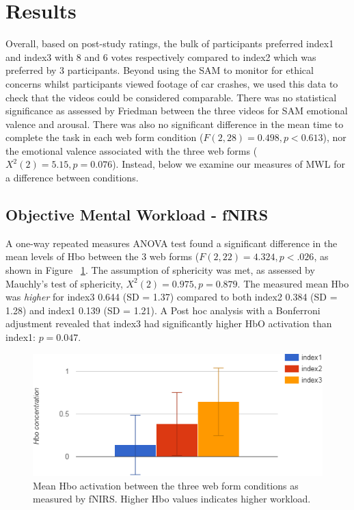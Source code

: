 \documentclass[../main/Feedback.tex]{subfiles}
\begin{document}
\section{Results}
Overall, based on post-study ratings, the bulk of participants preferred index1 and index3 with 8 and 6 votes respectively compared to index2 which was preferred by 3 participants. Beyond using the SAM to monitor for ethical concerns whilst participants viewed footage of car crashes, we used this data to check that the videos could be considered comparable. 
There was no statistical significance as assessed by Friedman between the three videos for SAM emotional valence and arousal.
There was also no significant difference in the mean time to complete the task in each web form condition ($F(2,28)=0.498, p<0.613$), nor the emotional valence associated with the three web forms ($X^{2}(2)=5.15,p=0.076$). 
Instead, below we examine our measures of MWL for a difference between conditions.
\subsection{Objective Mental Workload - fNIRS}
A one-way repeated measures ANOVA test found a significant difference in the mean levels of Hbo between the 3 web forms ($F(2,22)=4.324, p<.026$, as shown in Figure ~\ref{fig:mean-hbo-index123}. 
The assumption of sphericity was met, as assessed by Mauchly's test of sphericity, $X^{2}(2) = 0.975, p = 0.879$. 
The measured mean Hbo was \textit{higher} for index3 0.644 (SD = 1.37) compared to both index2 0.384 (SD = 1.28) and index1 0.139 (SD = 1.21). 
A Post hoc analysis with a Bonferroni adjustment revealed that index3 had significantly higher HbO activation than index1: $p=0.047$.

\begin{figure}[h]
	\centering
	\includegraphics[width=1\linewidth]{../figures/mean-Hbo-concentration-index123}
	\caption[mean Hbo activation between the three web forms]{Mean Hbo activation between the three web form conditions as measured by fNIRS. Higher Hbo values indicates higher workload.}
	\label{fig:mean-hbo-index123}
\end{figure}
		
\end{document}
